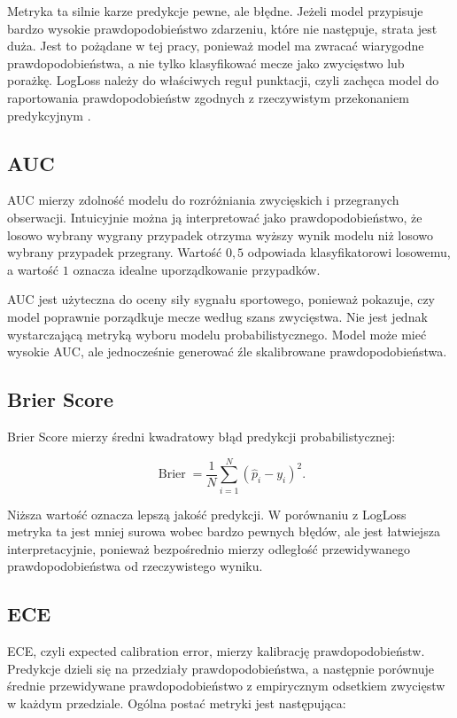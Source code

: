 Metryka ta silnie karze predykcje pewne, ale błędne. Jeżeli model przypisuje bardzo wysokie
prawdopodobieństwo zdarzeniu, które nie następuje, strata jest duża. Jest to pożądane w tej pracy,
ponieważ model ma zwracać wiarygodne prawdopodobieństwa, a nie tylko klasyfikować mecze jako
zwycięstwo lub porażkę. LogLoss należy do właściwych reguł punktacji, czyli zachęca model do
raportowania prawdopodobieństw zgodnych z rzeczywistym przekonaniem predykcyjnym
\parencite{gneiting2007}.

\subsection{AUC}

AUC mierzy zdolność modelu do rozróżniania zwycięskich i przegranych obserwacji. Intuicyjnie można
ją interpretować jako prawdopodobieństwo, że losowo wybrany wygrany przypadek otrzyma wyższy wynik
modelu niż losowo wybrany przypadek przegrany. Wartość \(0{,}5\) odpowiada klasyfikatorowi losowemu,
a wartość \(1\) oznacza idealne uporządkowanie przypadków.

AUC jest użyteczna do oceny siły sygnału sportowego, ponieważ pokazuje, czy model poprawnie
porządkuje mecze według szans zwycięstwa. Nie jest jednak wystarczającą metryką wyboru modelu
probabilistycznego. Model może mieć wysokie AUC, ale jednocześnie generować źle skalibrowane
prawdopodobieństwa.

\subsection{Brier Score}

Brier Score mierzy średni kwadratowy błąd predykcji probabilistycznej:

\begin{equation}
    \operatorname{Brier} = \frac{1}{N}\sum_{i=1}^{N}(\hat{p}_i - y_i)^2.
\end{equation}

Niższa wartość oznacza lepszą jakość predykcji. W porównaniu z LogLoss metryka ta jest mniej surowa
wobec bardzo pewnych błędów, ale jest łatwiejsza interpretacyjnie, ponieważ bezpośrednio mierzy
odległość przewidywanego prawdopodobieństwa od rzeczywistego wyniku.

\subsection{ECE}

ECE, czyli expected calibration error, mierzy kalibrację prawdopodobieństw. Predykcje dzieli się na
przedziały prawdopodobieństwa, a następnie porównuje średnie przewidywane prawdopodobieństwo z
empirycznym odsetkiem zwycięstw w każdym przedziale. Ogólna postać metryki jest następująca:

